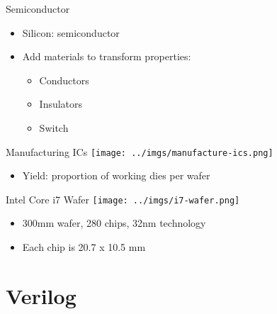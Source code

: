 \documentclass{beamer}
\begin{document}
\begin{frame}{Semiconductor}
\begin{itemize}
\item Silicon:  semiconductor
\item Add materials to transform properties:
\begin{itemize}
\item Conductors
\item Insulators
\item Switch
\end{itemize}
\end{itemize}
\end{frame}

\begin{frame}{Manufacturing ICs}
\texttt{[image: ../imgs/manufacture-ics.png]}
\begin{itemize}
\item Yield: proportion of working dies per wafer
\end{itemize}
\end{frame}

\begin{frame}{Intel Core i7 Wafer}
\texttt{[image: ../imgs/i7-wafer.png]}
\begin{itemize}
\item 300mm wafer, 280 chips, 32nm technology
\item Each chip is 20.7 x 10.5 mm
\end{itemize}
\end{frame}

\section{Verilog}
\subsection{}
\end{document}
